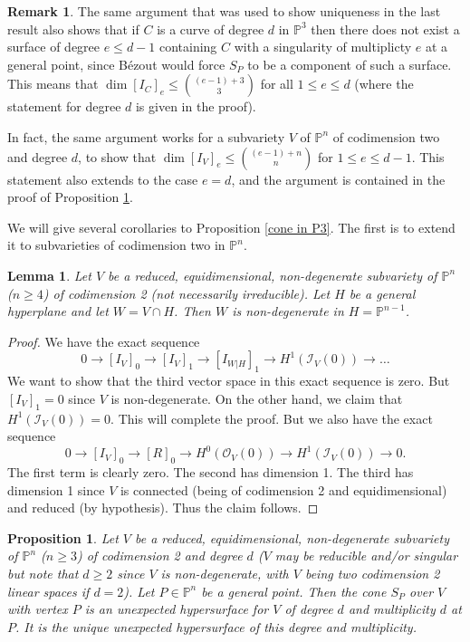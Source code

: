 \documentclass[12pt]{amsart}
\numberwithin{equation}{section}
\newtheorem{proposition}[theorem]{Proposition}
\newtheorem{lemma}[theorem]{Lemma}
\theoremstyle{definition}
\newtheorem{remark}[theorem]{Remark}
\newcommand{\PP}{ \ensuremath{\mathbb{P}}}
\begin{document}
\begin{remark} \label{low deg rmk}
The same argument that was used to show uniqueness in the last result also shows that if $C$ is a curve of degree $d$ in $\PP^3$ 
then there does not exist a surface of degree $e \leq d-1$ containing $C$ with a singularity of multiplicty $e$ at a general point, since 
B\'ezout would force $S_P$ to be a component of such a surface. This means that $\dim [I_C]_e \leq \binom{(e-1)+3}{3}$ for all 
$1 \leq e \leq d$ (where the statement for degree $d$ is given in the proof).

In fact, the same argument works for a subvariety $V$ of $\PP^n$ of codimension two and degree $d$, to show that 
$\dim [I_V]_e \leq \binom{(e-1)+n}{n}$ for $1 \leq e \leq d-1$. This statement also extends to the case $e=d$, and the argument is contained in the proof of Proposition \ref{Pn}.


\end{remark}



We will give several  corollaries to Proposition \ref{cone in P3}. The first is to extend it to subvarieties of codimension two in $\PP^n$.

\begin{lemma} \label{nondeg}
Let $V$ be a reduced, equidimensional, non-degenerate subvariety of $\PP^n$ ($n \geq 4$) of codimension 2 (not necessarily irreducible). 
Let $H$ be a general hyperplane and let $W = V \cap H$. Then $W$ is non-degenerate in $H = \PP^{n-1}$.
\end{lemma}

\begin{proof}
We have the exact sequence
\[
0 \rightarrow [I_V]_0 \rightarrow [I_V]_1 \rightarrow [I_{W|H}]_1 \rightarrow H^1(\mathcal I_V (0)) \rightarrow \dots
\]
We want to show that the third vector space in this exact sequence is zero. But $[I_V]_1 = 0$ since $V$ is non-degenerate. On the other 
hand, we claim that $H^1(\mathcal I_V(0)) = 0$. This will complete the proof. But we also have the exact sequence
\[
0 \rightarrow [I_V]_0 \rightarrow [R]_0 \rightarrow H^0(\mathcal O_V(0)) \rightarrow H^1(\mathcal I_V(0)) \rightarrow 0.
\]
The first term is clearly zero. The second has dimension 1. The third has dimension 1 since $V$ is connected (being of codimension 2 and 
equidimensional) and reduced (by hypothesis). Thus the claim follows.
\end{proof}

\begin{proposition} \label{Pn}
Let $V$ be a reduced, equidimensional, non-degenerate subvariety of $\PP^n$ ($n \geq 3$) of codimension 2 and degree $d$ ($V$ may be 
reducible and/or singular but note that $d \geq 2$ since $V$ is non-degenerate, with $V$ being two codimension 2 linear spaces if $d=2$). 
Let $P \in \PP^n$ be a general point.   
Then the cone $S_P$ over $V$ with vertex $P$ is an unexpected hypersurface for $V$ of degree $d$ and multiplicity $d$ at $P$. It is 
the unique unexpected hypersurface of this degree and multiplicity.
\end{proposition}
\end{document}
